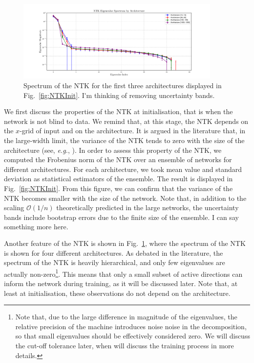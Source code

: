 \begin{figure}[t!]
  \centering
  \includegraphics[width=0.90\textwidth]{plots/ntk_eigenvalue_spectrum.pdf}
  \caption{Spectrum of the NTK for the first three architectures displayed in
  Fig.~\ref{fig:NTKInit}. \ac{I'm thinking of removing uncertainty bands.}}
  \label{fig:NTKSpectrum}
\end{figure}
We first discuss the properties of the NTK at initialisation, that is when the
network is not blind to data. We remind that, at this stage, the NTK depends on
the $x$-grid of input and on the architecture. It is argued in the literature
that, in the large-width limit, the variance of the NTK tends to zero with the
size of the architecture (see, \textit{e.g.}, \cite{Roberts:2021fes}). In order
to assess this property of the NTK, we computed the Frobenius norm of the NTK
over an ensemble of networks for different architectures. For each architecture,
we took mean value and standard deviation as statistical estimators of the
ensemble. The result is displayed in Fig.~\ref{fig:NTKInit}. From this figure,
we can confirm that the variance of the NTK becomes smaller with the size of the
network. Note that, in addition to the scaling $\mathcal{O}(1/n)$ theoretically
predicted in the large networks, the uncertainty bands include bootstrap errors
due to the finite size of the ensemble. \ac{I can say something more here.}

Another feature of the NTK is shown in Fig.~\ref{fig:NTKSpectrum}, where the
spectrum of the NTK is shown for four different architectures. As debated in the
literature, the spectrum of the NTK is heavily hierarchical, and only few
eigenvalues are actually non-zero\footnote{Note that, due to the large
difference in magnitude of the eigenvalues, the relative precision of the
machine introduces noise noise in the decomposition, so that small eigenvalues
should be effectively considered zero. We will discuss the cut-off tolerance
later, when will discuss the training process in more details.}. This means that
only a small subset of active directions can inform the network during training,
as it will be discussed later. Note that, at least at initialisation, these
observations do not depend on the architecture.

